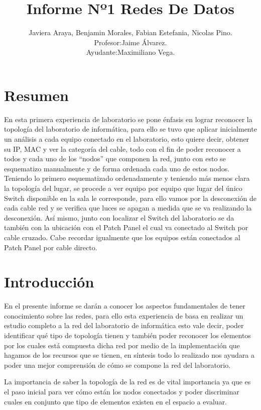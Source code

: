 \documentclass[spanish]{udpreport}
\title{Informe Nº1 Redes De Datos}
\author{Javiera Araya,
       Benjamin Morales,
        Fabian Estefania,
        Nicolas Pino.\\
        Profesor:Jaime Álvarez.\\
        Ayudante:Maximiliano Vega.}
\begin{document}
\maketitle

\tableofcontents
\chapter{Resumen  }

En esta primera experiencia de laboratorio se pone énfasis en lograr reconocer la topología del laboratorio de informática, para ello se tuvo que aplicar inicialmente un análisis a cada equipo conectado en el laboratorio, esto quiere decir, obtener su IP, MAC y ver la categoría del cable, todo con el fin de poder reconocer a todos y cada uno de los “nodos” que componen la red, junto con esto se esquematizo manualmente y de forma ordenada cada uno de estos nodos. 
Teniendo lo primero esquematizado ordenadamente y teniendo más menos clara la topología del lugar, se procede a ver equipo por equipo que lugar del  único Switch disponible en la sala  le corresponde, para ello vamos  por la desconexión de cada cable red y se verifica que luces  se apagan a medida que se va realizando la desconexión. 
Así mismo, junto con localizar el Switch del laboratorio se da también con la ubicación con el Patch Panel el cual va conectado al Switch por cable cruzado. Cabe recordar igualmente que los equipos están conectados al Patch Panel por cable directo.


\chapter{Introducción }



En el presente informe se darán a conocer los aspectos fundamentales de tener conocimiento sobre las redes, para ello esta experiencia de basa en  realizar un estudio completo a la red del laboratorio de informática esto vale decir, poder identificar qué tipo de topología tienen y también poder reconocer los elementos por los cuales está compuesta dicha red por medio de la implementación que hagamos de los recursos que se tienen, en síntesis todo lo realizado nos ayudara a poder una mejor comprensión de cómo se compone la red del laboratorio. 

La importancia de saber la topología de la red es de vital importancia ya que es el paso inicial para ver cómo están los nodos conectados y poder discriminar cuales en conjunto que tipo de elementos existen en el espacio a evaluar.
\end{document}
